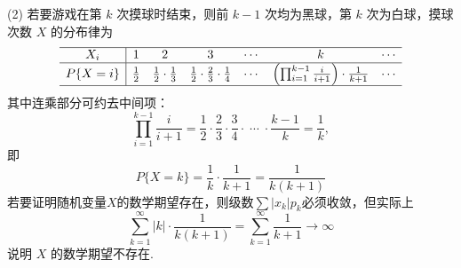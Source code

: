 \begin{solution}
\begin{center}
    \end{center}
    (2) 若要游戏在第 $k$ 次摸球时结束，则前 $k-1$ 次均为黑球，第 $k$ 次为白球，摸球次数 $X$ 的分布律为
    $$
        \begin{array}{c|cccccc}
            \hline
            X_i      & 1           & 2                           & 3                                           & \cdots & k                                                             & \cdots \\
            \hline
            P\{X=i\} & \frac{1}{2} & \frac{1}{2}\cdot\frac{1}{3} & \frac{1}{2}\cdot\frac{2}{3}\cdot\frac{1}{4} & \cdots & \left(\prod_{i=1}^{k-1}\frac{i}{i+1}\right)\cdot\frac{1}{k+1} & \cdots \\
            \hline
        \end{array}
    $$
    其中连乘部分可约去中间项：
    $$
        \prod_{i=1}^{k-1}\frac{i}{i+1}
        =\frac{1}{2}\cdot\frac{2}{3}\cdot\frac{3}{4}\cdot\;\cdots\;\cdot\frac{k-1}{k}
        =\frac{1}{k},
    $$
    即
    $$
        P\{X=k\} = \frac{1}{k}\cdot\frac{1}{k+1} = \frac{1}{k(k+1)}
    $$
    若要证明随机变量$X$的数学期望存在，则级数$\sum |x_k|p_k$必须收敛，但实际上
    $$
        \sum_{k=1}^{\infty} |k|\cdot\frac{1}{k(k+1)}
        = \sum_{k=1}^{\infty} \frac{1}{k+1}
        \to \infty
    $$
    说明 $X$ 的数学期望不存在.
\end{solution}

